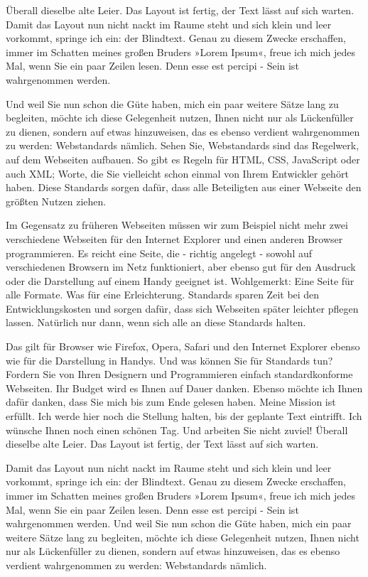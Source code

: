 Überall dieselbe alte Leier. Das Layout ist fertig, der Text lässt auf sich warten. Damit das Layout nun nicht nackt im Raume steht und sich klein und leer vorkommt, springe ich ein: der Blindtext. Genau zu diesem Zwecke erschaffen, immer im Schatten meines großen Bruders »Lorem Ipsum«, freue ich mich jedes Mal, wenn Sie ein paar Zeilen lesen. Denn esse est percipi - Sein ist wahrgenommen werden.

Und weil Sie nun schon die Güte haben, mich ein paar weitere Sätze lang zu begleiten, möchte ich diese Gelegenheit nutzen, Ihnen nicht nur als Lückenfüller zu dienen, sondern auf etwas hinzuweisen, das es ebenso verdient wahrgenommen zu werden: Webstandards nämlich. Sehen Sie, Webstandards sind das Regelwerk, auf dem Webseiten aufbauen. So gibt es Regeln für HTML, CSS, JavaScript oder auch XML; Worte, die Sie vielleicht schon einmal von Ihrem Entwickler gehört haben. Diese Standards sorgen dafür, dass alle Beteiligten aus einer Webseite den größten Nutzen ziehen.

Im Gegensatz zu früheren Webseiten müssen wir zum Beispiel nicht mehr zwei verschiedene Webseiten für den Internet Explorer und einen anderen Browser programmieren. Es reicht eine Seite, die - richtig angelegt - sowohl auf verschiedenen Browsern im Netz funktioniert, aber ebenso gut für den Ausdruck oder die Darstellung auf einem Handy geeignet ist. Wohlgemerkt: Eine Seite für alle Formate. Was für eine Erleichterung. Standards sparen Zeit bei den Entwicklungskosten und sorgen dafür, dass sich Webseiten später leichter pflegen lassen. Natürlich nur dann, wenn sich alle an diese Standards halten.

Das gilt für Browser wie Firefox, Opera, Safari und den Internet Explorer ebenso wie für die Darstellung in Handys. Und was können Sie für Standards tun? Fordern Sie von Ihren Designern und Programmieren einfach standardkonforme Webseiten. Ihr Budget wird es Ihnen auf Dauer danken. Ebenso möchte ich Ihnen dafür danken, dass Sie mich bis zum Ende gelesen haben. Meine Mission ist erfüllt. Ich werde hier noch die Stellung halten, bis der geplante Text eintrifft. Ich wünsche Ihnen noch einen schönen Tag. Und arbeiten Sie nicht zuviel! Überall dieselbe alte Leier. Das Layout ist fertig, der Text lässt auf sich warten.

Damit das Layout \label{oxmox} nun nicht nackt im Raume steht und sich klein und leer vorkommt, springe ich ein: der Blindtext. Genau zu diesem Zwecke erschaffen, immer im Schatten meines großen Bruders »Lorem Ipsum«, freue ich mich jedes Mal, wenn Sie ein paar Zeilen lesen. Denn esse est percipi - Sein ist wahrgenommen werden. Und weil Sie nun schon die Güte haben, mich ein paar weitere Sätze lang zu begleiten, möchte ich diese Gelegenheit nutzen, Ihnen nicht nur als Lückenfüller zu dienen, sondern auf etwas hinzuweisen, das es ebenso verdient wahrgenommen zu werden: Webstandards nämlich.

